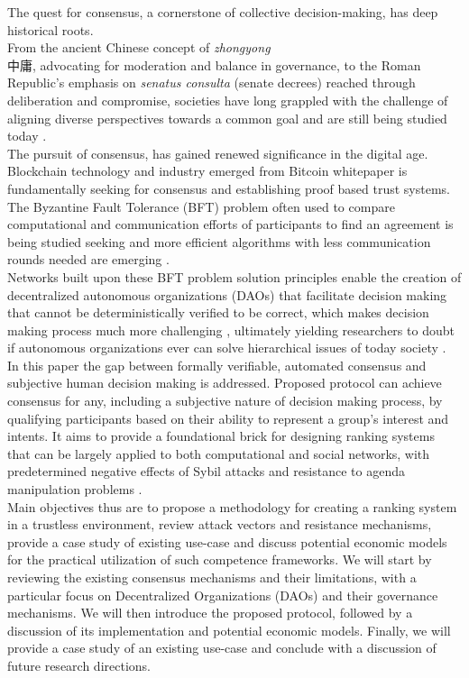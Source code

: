 \documentclass{article}
\begin{document}
\begin{CJK}{UTF8}{gbsn}
\begin{multicols}{2}
The quest for consensus, a cornerstone of collective decision-making, has deep historical roots. \\
From the ancient Chinese concept of \textit{zhongyong} \\ {
中庸}, advocating for moderation and balance in governance, to the Roman Republic's emphasis on \textit{senatus consulta} (senate decrees) reached through deliberation and compromise, societies have long grappled with the challenge of aligning diverse perspectives towards a common goal and are still being studied today \cite{Andersen2019} \cite{Frederic2014}. \\
The pursuit of consensus, has gained renewed significance in the digital age. Blockchain technology and industry emerged from Bitcoin whitepaper\cite{Satoshi} is fundamentally seeking for consensus and establishing proof based trust systems. The Byzantine Fault Tolerance (BFT) problem often used to compare computational and communication efforts of participants to find an agreement is being studied seeking and more efficient algorithms with less communication rounds needed are emerging \cite{Genrui2023}. \\
Networks built upon these BFT problem solution principles enable the creation of decentralized autonomous organizations (DAOs) \cite{Hassan2021} that facilitate decision making that cannot be deterministically verified to be correct\cite{Shuai2019}, which makes decision making process much more challenging \cite{Rainer2023}, ultimately yielding researchers to doubt if autonomous organizations ever can solve hierarchical issues of today society \cite{Marcella2016}.   \\
In this paper the gap between formally verifiable, automated consensus and subjective human decision making is addressed. Proposed protocol can achieve consensus for any, including a subjective nature of decision making process, by qualifying participants based on their ability to represent a group's interest and intents. It aims to provide a foundational brick for designing ranking systems that can be largely applied to both computational and social networks, with predetermined negative effects of Sybil attacks and resistance to agenda manipulation problems \cite{McKelvey1976}.\\
Main objectives thus are to propose a methodology for creating a ranking system in a trustless environment, review attack vectors and resistance mechanisms, provide a case study of existing use-case and discuss potential economic models for the practical utilization of such competence frameworks.
We will start by reviewing the existing consensus mechanisms and their limitations, with a particular focus on Decentralized Organizations (DAOs) and their governance mechanisms. We will then introduce the proposed protocol, followed by a discussion of its implementation and potential economic models. Finally, we will provide a case study of an existing use-case and conclude with a discussion of future research directions.


\end{multicols}
\end{CJK}
\end{document}
